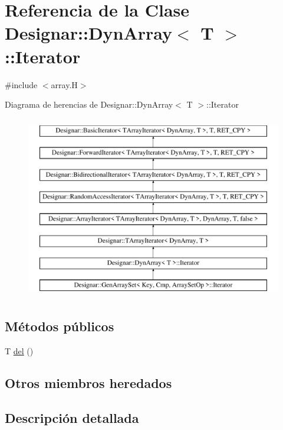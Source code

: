 \hypertarget{class_designar_1_1_dyn_array_1_1_iterator}{}\section{Referencia de la Clase Designar\+:\+:Dyn\+Array$<$ T $>$\+:\+:Iterator}
\label{class_designar_1_1_dyn_array_1_1_iterator}


{\ttfamily \#include $<$array.\+H$>$}

Diagrama de herencias de Designar\+:\+:Dyn\+Array$<$ T $>$\+:\+:Iterator\begin{figure}[H]
\begin{center}
\leavevmode
\includegraphics[height=8.000000cm]{class_designar_1_1_dyn_array_1_1_iterator}
\end{center}
\end{figure}
\subsection*{Métodos públicos}
\begin{DoxyCompactItemize}
\item 
T \hyperlink{class_designar_1_1_dyn_array_1_1_iterator_a3d700006f23d3c4b63e109edef32410f}{del} ()
\end{DoxyCompactItemize}
\subsection*{Otros miembros heredados}


\subsection{Descripción detallada}
